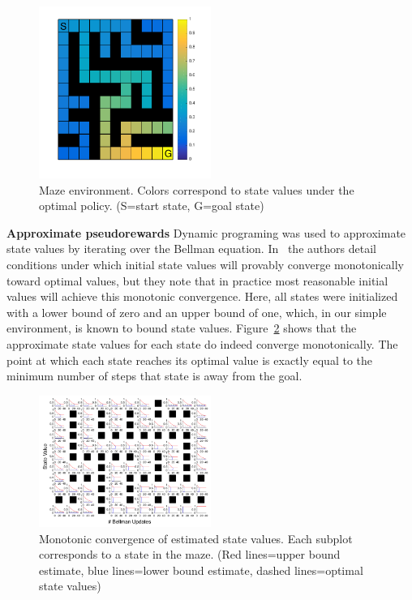 \documentclass[letterpaper]{article}
\begin{document}
\begin{figure}[ht]
\centering
\includegraphics[width=0.5\textwidth]{maze_values}
\caption{Maze environment. Colors correspond to state values under the optimal policy. (S=start state, G=goal state)}
\label{fig:maze_values}
\end{figure}

\noindent
\textbf{Approximate pseudorewards} Dynamic programing was used to approximate state values by iterating over the Bellman equation. In~\cite{mcmahan2005bounded} the authors detail conditions under which initial state values will provably converge monotonically toward optimal values, but they note that in practice most reasonable initial values will achieve this monotonic convergence. Here, all states were initialized with a lower bound of zero and an upper bound of one, which, in our simple environment, is known to bound state values. Figure~\ref{fig:value_bounds} shows that the approximate state values for each state do indeed converge monotonically. The point at which each state reaches its optimal value is exactly equal to the minimum number of steps that state is away from the goal.

\begin{figure}[ht]
\centering
\includegraphics[width=0.5\textwidth]{value_bounds_labeled}
\caption{Monotonic convergence of estimated state values. Each subplot corresponds to a state in the maze. (Red lines=upper bound estimate, blue lines=lower bound estimate, dashed lines=optimal state values)}
\label{fig:value_bounds}
\end{figure}
\end{document}
